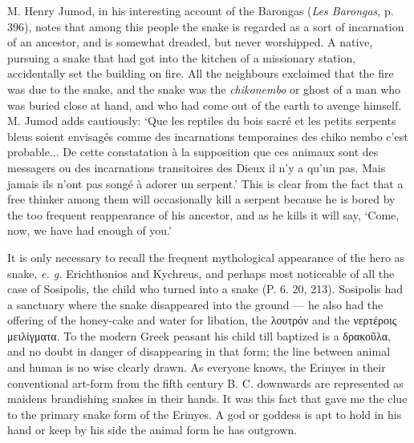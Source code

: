 \documentclass[a4paper, 11pt, oneside, polutonikogreek, english]{article}
\begin{document}
M. Henry Jumod, in his interesting account of the Barongas (\emph{Les Barongas}, p. 396), notes that among this people the snake is regarded as a sort of incarnation of an ancestor, and is somewhat dreaded, but never worshipped. A native, pursuing a snake that had got into the kitchen of a missionary station, accidentally set the building on fire. All the neighbours exclaimed that the fire was due to the snake, and the snake was the \emph{chikonembo} or ghost of a man who was buried close at hand, and who had come out of the earth to avenge himself. M. Jumod adds cautiously: `Que les reptiles du bois sacré et les petits serpents bleus soient envisagés comme des incarnations temporaines des chiko nembo c'est probable... De cette constatation à la supposition que ces animaux sont des messagers ou des incarnations transitoires des Dieux il n'y a qu'un pas. Mais jamais ils n'ont pas songé à adorer un serpent.' This is clear from the fact that a free thinker among them will occasionally kill a serpent because he is bored by the too frequent reappearance of his ancestor, and as he kills it will say, `Come, now, we have had enough of you.'

It is only necessary to recall the frequent mythological appearance of the hero as snake, \emph{e. g.} Erichthonios and Kychreus, and perhaps most noticeable of all the case of Sosipolis, the child who turned into a snake (P. 6. 20, 213). Sosipolis had a sanctuary where the snake disappeared into the ground --- he also had the offering of the honey-cake and water for libation, the λουτρόν and the νερτέροις μειλίγματα. To the modern Greek peasant his child till baptized is a δρακοῦλα, and no doubt in danger of disappearing in that form; the line between animal and human is no wise clearly drawn. As everyone knows, the Erinyes in their conventional art-form from the fifth century B. C. downwards are represented as maidens brandishing snakes in their hands. It was this fact that gave me the clue to the primary snake form of the Erinyes. A god or goddess is apt to hold in his hand or keep by his side the animal form he has outgrown.
\end{document}
